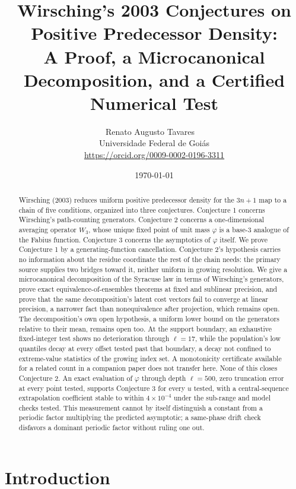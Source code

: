 \documentclass[11pt]{article}
\title{Wirsching's 2003 Conjectures on Positive Predecessor Density:\\
A Proof, a Microcanonical Decomposition, and a Certified Numerical Test}
\author{Renato Augusto Tavares~{\small\href{mailto:dr.renatotavares@gmail.com}{\textcolor{black}{\faEnvelope}}}~\orcidlink{0009-0002-0196-3311}\\
\normalsize Universidade Federal de Goiás\\
\small \href{https://orcid.org/0009-0002-0196-3311}{https://orcid.org/0009-0002-0196-3311}}
\date{\today}
\theoremstyle{remark}
\begin{document}
\maketitle

\begin{abstract}
Wirsching (2003) reduces uniform positive predecessor density for the
$3n+1$ map to a chain of five conditions, organized into three
conjectures. Conjecture 1 concerns Wirsching's path-counting
generators. Conjecture 2 concerns a one-dimensional averaging operator
$W_3$, whose unique fixed point of unit mass $\varphi$ is a base-$3$
analogue of the Fabius function. Conjecture 3 concerns the asymptotics of
$\varphi$ itself. We prove Conjecture 1 by a generating-function
cancellation. Conjecture 2's hypothesis carries no information about
the residue coordinate the rest of the chain needs: the primary source
supplies two bridges toward it, neither uniform in growing resolution.
We give a microcanonical
decomposition of the Syracuse law in terms of Wirsching's generators,
prove exact equivalence-of-ensembles theorems at fixed and sublinear
precision, and prove that the same decomposition's latent cost vectors
fail to converge at linear precision, a narrower fact than
nonequivalence after projection, which remains open. The
decomposition's own open hypothesis, a uniform lower bound on the
generators relative to their mean, remains open too. At the support
boundary, an exhaustive fixed-integer test shows no deterioration
through $\ell=17$, while the population's low quantiles decay at every
offset tested past that boundary, a decay not confined to
extreme-value statistics of the growing index set. A monotonicity
certificate
available for a related count in a companion paper does not transfer
here. None of this closes Conjecture 2. An exact evaluation of
$\varphi$ through depth $\ell=500$, zero truncation error at every
point tested, supports Conjecture 3 for every $u$ tested,
with a central-sequence extrapolation coefficient stable to within
$4\times10^{-4}$ under the sub-range and model checks tested. This
measurement cannot by itself distinguish a constant from a
periodic factor multiplying the predicted asymptotic; a same-phase
drift check disfavors a dominant periodic factor without ruling one
out.
\end{abstract}

\section{Introduction}
\label{sec:intro}
\end{document}
